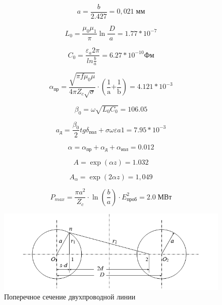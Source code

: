 \documentclass[fontsize=14pt,a4paper]{scrartcl}
\begin{document}
    \begin{equation}
      a=\frac{b}{2.427}=0,021\; \text{мм}
    \end{equation}

    \begin{equation}
      L_0=\frac{\mu_0\mu_1}{\pi}\ln{\frac{\ D}{a}=1.77\ast{10}^{-7}}
    \end{equation}

    \begin{equation}
      C_0=\frac{\varepsilon_a2\pi}{ln\frac{b}{a}\ }=6.27\ast10^{-10}Фм
    \end{equation}

    \begin{equation}
      \alpha_\text{пр}=\frac{\sqrt{\pi f\mu_0\mu}}{4\pi Z_c \sqrt\sigma}\cdot\left(\frac{\mathrm{1}}{\mathrm{a}}\mathrm{+} \frac{\mathrm{1} }{\mathrm{b}}\right)\mathrm{=4.121*}{\mathrm{10}}^{\mathrm{-3}}
    \end{equation}

    \begin{equation}
      \beta_0=\omega\sqrt{L_0C_0}=106.05
    \end{equation}

    \begin{equation}
      a_\text{д}=\frac{\beta_0}{2}tg\delta_\text{пол}+σωεa1=7.95*10^{-3}
    \end{equation}

    \begin{equation}
      \alpha=\alpha_\text{пр}+\alpha_\text{д}+\alpha_\text{изл}=0.012
    \end{equation}

    \begin{equation}
      A=\exp{\left(\alpha z\right)}=1.032
    \end{equation}

    \begin{equation}
      A_\alpha=\exp{\left(2\alpha z\right)}=1,049
    \end{equation}

    \begin{equation}
      P_{max}=\frac{\pi a^2}{Z_c}\cdot\ln{\left(\frac{b}{a}\right)}\cdot E_\text{проб}^2=2.0 \; \text{МВт}
    \end{equation}

    \begin{figure}[h!]
      \centering
      \includegraphics[scale=0.6]{data/lab_5/fig/2.png}
      \caption{Поперечное сечение двухпроводной линии}
      \label{fig:ris2}
    \end{figure}
\end{document}
